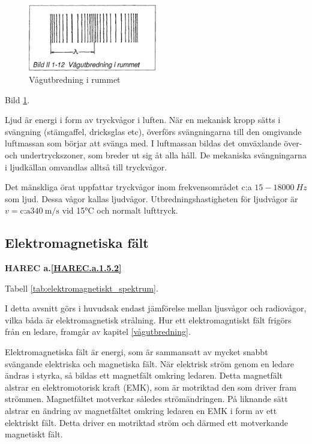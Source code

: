 \begin{figure}
  \includegraphics[width=0.5\textwidth]{images/bild_2_1-12}
  \caption{Vågutbredning i rummet}
  \label{fig:BildII1-12}
\end{figure}

Bild \ref{fig:BildII1-12}.

Ljud är energi i form av tryckvågor i luften. När en mekanisk kropp sätts i
svängning (stämgaffel, dricksglas etc), överförs svängningarna till den
omgivande luftmassan som börjar att svänga med. I luftmassan bildas det
omväxlande över- och undertryckszoner, som breder ut sig åt alla håll. De
mekaniska svängningarna i ljudkällan omvandlas alltså till tryckvågor.

Det mänskliga örat uppfattar tryckvågor inom frekvensområdet c:a
\(15-18000\ Hz\) som ljud. Dessa vågor kallas ljudvågor. Utbredningshastigheten
för ljudvågor är \(v = \text{c:a} 340\ \text{m/s}\) vid  15°C och normalt lufttryck.

\subsection{Elektromagnetiska fält}
\textbf{HAREC a.\ref{HAREC.a.1.5.2}\label{myHAREC.a.1.5.2}}

Tabell \ref{tab:elektromagnetiskt_spektrum}.

I detta avsnitt görs i huvudsak endast jämförelse mellan ljusvågor och
radiovågor, vilka båda är elektromagnetisk strålning. Hur ett elektromagntiskt
fält frigörs från en ledare, framgår av kapitel \ref{vågutbredning}.

Elektromagnetiska fält är energi, som är sammansatt av mycket snabbt svängande
elektriska och magnetiska fält. När elektrisk ström genom en ledare ändras i
styrka, så bildas ett magnetfält omkring ledaren. Detta magnetfält alstrar en
elektromotorisk kraft (EMK), som är motriktad den som driver fram strömmen.
Magnetfältet motverkar således strömändringen. På liknande sätt alstrar en
ändring av magnetfältet omkring ledaren en EMK i form av ett elektriskt fält.
Detta driver en motriktad ström och därmed ett motverkande magnetiskt fält.

